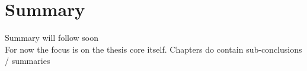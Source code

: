 \chapter*{Summary}


Summary will follow soon \\

For now the focus is on the thesis core itself. 
Chapters do contain sub-conclusions / summaries 
